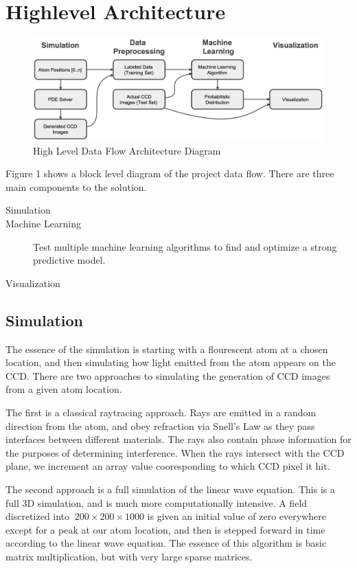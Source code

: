 \section{Highlevel Architecture}
\label{architecture}

\begin{figure}[h]
\begin{center}
\includegraphics[scale=0.4]{arch.png}
\caption{High Level Data Flow Architecture Diagram}
\label{fig:arch}
\end{center}
\end{figure}

\noindent Figure 1 shows a block level diagram of the project data flow. There are three main components to the solution.
\begin{description}
\item[Simulation] 
\item[Machine Learning] Test multiple machine learning algorithms to find and optimize a strong predictive model.
\item[Visualization]
\end{description}

\subsection{Simulation}
The essence of the simulation is starting with a flourescent atom at a chosen location, and then simulating how light emitted from the atom appears on the CCD. There are two approaches to simulating the generation of CCD images from a given atom location.

The first is a classical raytracing approach. Rays are emitted in a random direction from the atom, and obey refraction via Snell's Law as they pass interfaces between different materials. The rays also contain phase information for the purposes of determining interference. When the rays intersect with the CCD plane, we increment an array value cooresponding to which CCD pixel it hit.

The second approach is a full simulation of the linear wave equation. This is a full 3D simulation, and is much more computationally intensive. A field discretized into $~200\times 200\times 1000$ is given an initial value of zero everywhere except for a peak at our atom location, and then is stepped forward in time according to the linear wave equation. The essence of this algorithm is basic matrix multiplication, but with very large sparse matrices.

